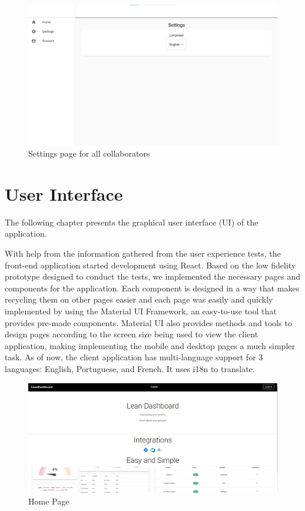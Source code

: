 \documentclass[a4paper,twoside,10pt]{report}
\begin{document}
\begin{figure}[h!]
\center
  \includegraphics[width=\textwidth]{settingsPageForCollaborators.png}
\caption{Settings page for all collaborators}
\end{figure}



\chapter{User Interface}
The following chapter presents the graphical user interface (UI) of the application.

With help from the information gathered from the user experience tests, the front-end application started development using React.
\newline
Based on the low fidelity prototype designed to conduct the tests, we implemented the necessary pages and components for the application.
\newline
Each component is designed in a way that makes recycling them on other pages easier and each page was easily and quickly implemented by using the Material UI Framework, an easy-to-use tool that provides pre-made components.
Material UI also provides methods and tools to design pages according to the screen size being used to view the client application, making implementing the mobile and desktop pages a much simpler task.
\newline
As of now, the client application has multi-language support for 3 languages: English, Portuguese, and French. It uses i18n to translate.
 
\begin{figure}[h!]
\center
  \includegraphics[width=\textwidth]{HomePage.png}
\caption{Home Page}
\end{figure}
\end{document}
